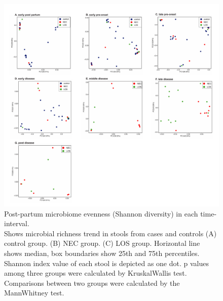 \documentclass[fleqn,10pt, lineno]{wlpeerj} %
\begin{document}
\begin{figure}[ht]\centering
  \includegraphics[width=\linewidth]{pcoa_time_group.pdf}
  \caption{Post-partum microbiome evenness (Shannon diversity) in each time-interval. \\ Shows microbial richness trend in stools from cases and controls (A) control group. (B) NEC group. (C) LOS group. Horizontal line shows median, box boundaries show 25th and 75th percentiles.  Shannon index value of each stool is depicted as one dot. p values among three groups were calculated by Kruskal\-Wallis test. Comparisons between two groups were calculated by the Mann\-Whitney test. }
  \label{fig:pcoa}
\end{figure}
\end{document}
